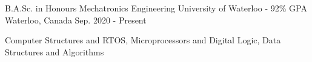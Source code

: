 

\begin{cventries}

  \cventry
    {B.A.Sc. in Honours Mechatronics Engineering} %
    {University of Waterloo - 92\% GPA} %
    {Waterloo, Canada} %
    {Sep. 2020 - Present} %
    {
      \begin{cvitems}
        \item{Computer Structures and RTOS, Microprocessors and Digital Logic, Data Structures and Algorithms}
      \end{cvitems}
    }
\end{cventries}
